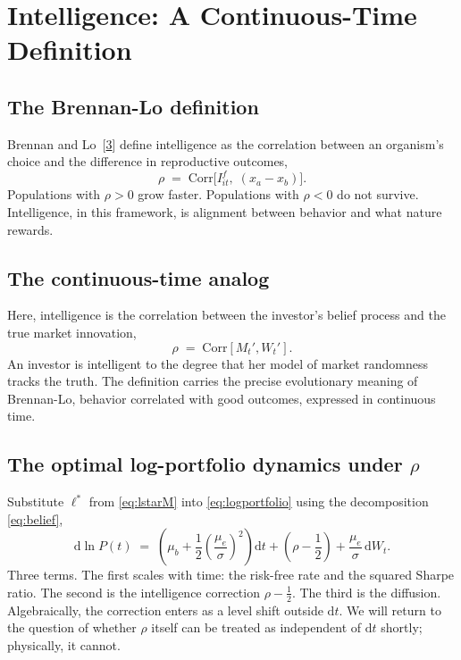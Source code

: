 \documentclass[11pt]{article}
\newcommand{\lopt}{\ell^{*}}
\newcommand{\mue}{\mu_{e}}
\newcommand{\mub}{\mu_{b}}
\newcommand{\Corr}{\mathrm{Corr}}
\newcommand{\dd}{\mathrm{d}}
\begin{document}
\section{Intelligence: A Continuous-Time Definition}

\subsection{The Brennan-Lo definition}

Brennan and Lo~[\hyperlink{ref:3}{3}] define intelligence as the correlation between an
organism's choice and the difference in reproductive outcomes,
\[
  \rho \;=\; \Corr\!\bigl[I^{f}_{it},\; (x_{a} - x_{b})\bigr].
\]
Populations with $\rho > 0$ grow faster. Populations with $\rho < 0$
do not survive. Intelligence, in this framework, is alignment between
behavior and what nature rewards.

\subsection{The continuous-time analog}

Here, intelligence is the correlation between the investor's belief
process and the true market innovation,
\[
  \rho \;=\; \Corr[M_{t}', W_{t}'].
\]
An investor is intelligent to the degree that her model of market
randomness tracks the truth. The definition carries the precise
evolutionary meaning of Brennan-Lo, behavior correlated with good outcomes, expressed in continuous time.

\subsection{The optimal log-portfolio dynamics under $\rho$}

Substitute $\lopt$ from \eqref{eq:lstarM} into \eqref{eq:logportfolio}
using the decomposition \eqref{eq:belief},
\begin{equation}
  \dd\ln P(t) \;=\; \left(\mub
  + \frac{1}{2}\left(\frac{\mue}{\sigma}\right)^{\!2}\right)\dd t
  + \left(\rho - \frac{1}{2}\right)
  + \frac{\mue}{\sigma}\,\dd W_{t}.
  \label{eq:optlogdyn}
\end{equation}
Three terms. The first scales with time: the risk-free rate and the
squared Sharpe ratio. The second is the intelligence correction
$\rho - \tfrac{1}{2}$. The third is the diffusion. Algebraically,
the correction enters as a level shift outside $\dd t$. We will
return to the question of whether $\rho$ itself can be treated as
independent of $\dd t$ shortly; physically, it cannot.
\end{document}

